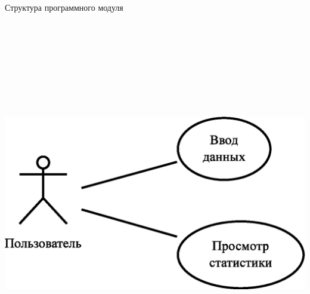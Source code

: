 \documentclass[russian,utf8,a1paper,nostitching,simple]{eskdgraph}
\begin{document}
\begin{ESKDdrawing}
  \centering
  {\fontsize{50}{60}\selectfont Структура программного модуля}

  \vspace{2cm}
  \begin{minipage}{38cm}
    \centering
     \\
    \vspace{2cm}
    \centering
    \includegraphics[height=15cm]{fig/design_use_cases.eps}


\end{minipage}
\end{ESKDdrawing}
\end{document}
